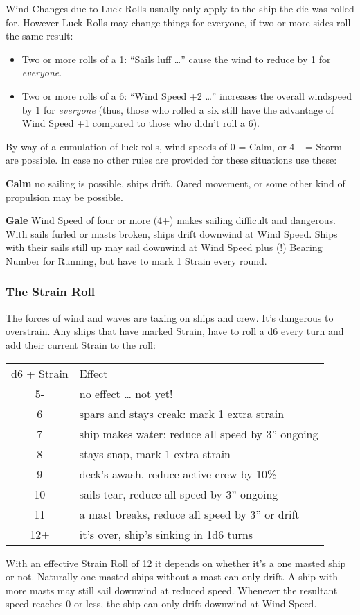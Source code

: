\documentclass[11pt]{wbzine}
\begin{document}
\begin{multicols}{2}
Wind Changes due to Luck Rolls usually only apply to the ship the die
was rolled for. However Luck Rolls may change things for everyone, if
two or more sides roll the same result:

\begin{itemize}
\item
  Two or more rolls of a 1: ``Sails luff \ldots{}'' cause the wind to
  reduce by 1 for \emph{everyone}.
\item
  Two or more rolls of a 6: ``Wind Speed +2 \ldots{}'' increases the
  overall windspeed by 1 for \emph{everyone} (thus, those who rolled a
  six still have the advantage of Wind Speed +1 compared to those who
  didn't roll a 6).
\end{itemize}

By way of a cumulation of luck rolls, wind speeds of 0 = Calm, or 4+ =
Storm are possible. In case no other rules are provided for these
situations use these:

\textbf{Calm} no sailing is possible, ships drift. Oared movement, or
some other kind of propulsion may be possible.

\textbf{Gale} Wind Speed of four or more (4+) makes sailing difficult
and dangerous. With sails furled or masts broken, ships drift downwind
at Wind Speed. Ships with their sails still up may sail downwind at Wind
Speed plus (!) Bearing Number for Running, but have to mark 1 Strain
every round.

\subsubsection{The Strain Roll}

The forces of wind and waves are taxing on ships and crew. It's
dangerous to overstrain. Any ships that have marked Strain, have to roll
a d6 every turn and add their current Strain to the roll:

\begin{tabularx}{\columnwidth}{cZ}
d6 + Strain & Effect \\
5- & no effect \ldots{} not yet! \\
6 & spars and stays creak: mark 1 extra strain \\
7 & ship makes water: reduce all speed by 3'' ongoing \\
8 & stays snap, mark 1 extra strain \\
9 & deck's awash, reduce active crew by 10\% \\
10 & sails tear, reduce all speed by 3'' ongoing \\
11 & a mast breaks, reduce all speed by 3'' or drift \\
12+ & it's over, ship's sinking in 1d6 turns \\
\end{tabularx}

With an effective Strain Roll of 12 it depends on whether it's a one
masted ship or not. Naturally one masted ships without a mast can only
drift. A ship with more masts may still sail downwind at reduced speed.
Whenever the resultant speed reaches 0 or less, the ship can only drift
downwind at Wind Speed.

\end{multicols}
\end{document}
